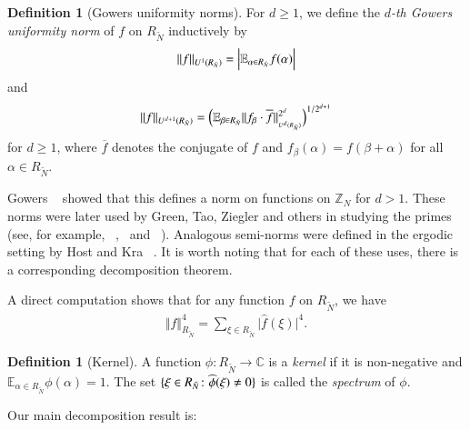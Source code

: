 \documentclass[12pt,amstex]{amsart}
\theoremstyle{definition}
\newtheorem{defn}[thm]{Definition}
\def \A {\alpha}
\def \B {\beta}
\def \R {R_{\tilde{N}}}
\def \x {\bold{\xi}}
\begin{document}
\begin{defn}[Gowers uniformity norms]
For $d\geq 1$, we define the \emph{$d$-th Gowers uniformity norm} of $f$ on $\R$ inductively by
  \begin{equation}\nonumber
    \begin{split}
      \Vert f\Vert_{U^{1}(\R)}=\Bigl\vert\mathbb{E}_{\A\in \R}f(\A)\Bigr\vert
    \end{split}
  \end{equation}
and
  \begin{equation}\nonumber
    \begin{split}
      \Vert f\Vert_{U^{d+1}(\R)}=\Bigl(\mathbb{E}_{\B\in \R}\Vert f_{\B}\cdot\overline{f}\Vert_{_{U^{d}(\R)}}^{2^{d}}\Bigr)^{1/2^{d+1}}
    \end{split}
  \end{equation}
for $d\geq 1$, where $\overline{f}$ denotes the conjugate of $f$ and $f_{\B}(\A)=f(\B+\A)$ for all $\A\in\R$.
\end{defn}
Gowers ~\cite{G} showed that this defines a norm on functions on $\mathbb{Z}_{N}$ for $d>1$. These norms were later used by Green, Tao, Ziegler and others in studying the primes (see, for example, ~\cite{5},~\cite{65} and ~\cite{6}). Analogous semi-norms were defined in the ergodic setting by Host and Kra ~\cite{HK}. It is worth noting that for each of these uses, there is a corresponding decomposition theorem.

A direct computation shows that for any function $f$ on $\R$, we have
\begin{equation}\label{F}
    \begin{split}
      \Vert f\Vert_{\R}^{4}=\sum_{\xi\in \R}\vert\widehat{f}(\xi)\vert^{4}.
    \end{split}
  \end{equation}

\begin{defn}[Kernel]
A function $\phi\colon \R\rightarrow\mathbb{C}$ is a \emph{kernel} if it is non-negative and $\mathbb{E}_{\A\in\R}\phi(\A)=1$. The set $\{\x\in \R\colon \widehat{\phi}(\x)\neq 0\}$ is called the \emph{spectrum} of $\phi$.
\end{defn}

Our main decomposition result is:
\end{document}
